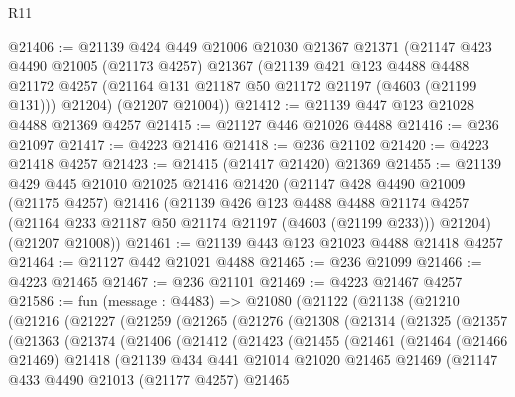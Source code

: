 \begin{lexlean}{R11}
\begin{coremodule}
@21406 := @21139
    @424
    @449
    @21006
    @21030
    @21367
    @21371
    (@21147
      @423
      @4490
      @21005
      (@21173 @4257)
      @21367
      (@21139
        @421
        @123
        @4488
        @4488
        @21172
        @4257
        (@21164 @131 @21187 @50 @21172 @21197 (@4603 (@21199 @131)))
        @21204)
      (@21207 @21004))
@21412 := @21139 @447 @123 @21028 @4488 @21369 @4257
@21415 := @21127 @446 @21026 @4488
@21416 := @236 @21097
@21417 := @4223 @21416
@21418 := @236 @21102
@21420 := @4223 @21418 @4257
@21423 := @21415 (@21417 @21420) @21369
@21455 := @21139
    @429
    @445
    @21010
    @21025
    @21416
    @21420
    (@21147
      @428
      @4490
      @21009
      (@21175 @4257)
      @21416
      (@21139
        @426
        @123
        @4488
        @4488
        @21174
        @4257
        (@21164 @233 @21187 @50 @21174 @21197 (@4603 (@21199 @233)))
        @21204)
      (@21207 @21008))
@21461 := @21139 @443 @123 @21023 @4488 @21418 @4257
@21464 := @21127 @442 @21021 @4488
@21465 := @236 @21099
@21466 := @4223 @21465
@21467 := @236 @21101
@21469 := @4223 @21467 @4257
@21586 := fun (message : @4483) =>
  @21080
    (@21122
      (@21138
        (@21210
          (@21216
            (@21227
              (@21259
                (@21265
                  (@21276
                    (@21308
                      (@21314
                        (@21325
                          (@21357
                            (@21363
                              (@21374
                                (@21406
                                  (@21412
                                    (@21423
                                      (@21455
                                        (@21461
                                          (@21464
                                            (@21466 @21469)
                                            @21418
                                            (@21139
                                              @434
                                              @441
                                              @21014
                                              @21020
                                              @21465
                                              @21469
                                              (@21147
                                                @433
                                                @4490
                                                @21013
                                                (@21177 @4257)
                                                @21465

\end{coremodule}
\end{lexlean}
